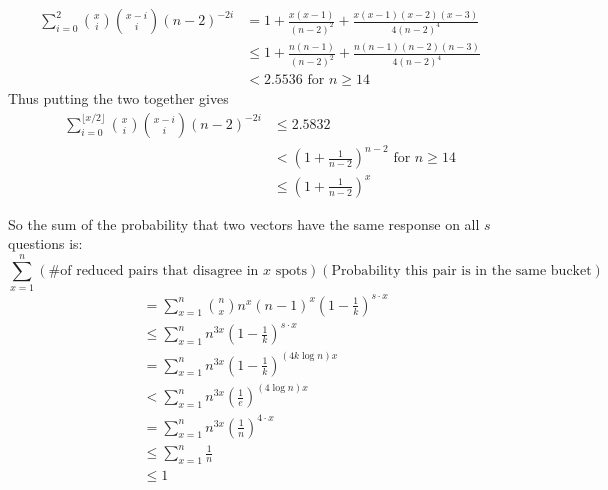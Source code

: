\documentclass[12pt, a4paper]{article}
\begin{document}
\begin{align*}
\sum_{i=0}^{2} \binom{x}{i}\binom{x-i}{i}(n-2)^{-2i} & = 1+\frac{x(x-1)}{(n-2)^2}+\frac{x(x-1)(x-2)(x-3)}{4(n-2)^4} \\
& \le 1+\frac{n(n-1)}{(n-2)^2}+\frac{n(n-1)(n-2)(n-3)}{4(n-2)^4} \\
& < 2.5536 \text{ for } n\ge 14
\end{align*}
Thus putting the two together gives
\begin{align*}
\sum_{i=0}^{\lfloor x/2 \rfloor} \binom{x}{i}\binom{x-i}{i}(n-2)^{-2i} & \le 2.5832 \\
& < \left(1+\frac{1}{n-2}\right)^{n-2} \text{ for } n\ge14\\
& \le \left(1+\frac{1}{n-2}\right)^{x}
\end{align*}

\clearpage
So the sum of the probability that two vectors have the same response on all $s$ questions is:
\begin{equation*}
\sum_{x=1}^n(\text{\# of reduced pairs that disagree in $x$ spots})(\text{Probability this pair is in the same bucket}) 
\end{equation*}
\begin{align*}
&=\sum_{x=1}^n \binom{n}{x}n^x(n-1)^x \left(1-\frac{1}{k}\right)^{s\cdot x} \\
&\le \sum_{x=1}^n n^{3x} \left(1-\frac{1}{k}\right)^{s\cdot x} \\
&= \sum_{x=1}^n n^{3x} \left(1-\frac{1}{k}\right)^{(4k\log n)x} \\
&< \sum_{x=1}^n n^{3x} \left(\frac{1}{e}\right)^{(4\log n)x} \\
&= \sum_{x=1}^n n^{3x} \left(\frac{1}{n}\right)^{4\cdot x} \\
&\le \sum_{x=1}^n \frac{1}{n} \\
&\le 1
\end{align*}
\end{document}
